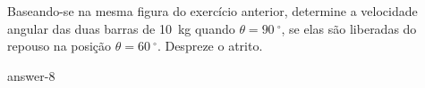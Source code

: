 \item Baseando-se na mesma figura do exercício anterior, determine a velocidade angular das duas barras de \SI{10}{\kilogram} quando $\theta=\SI{90}{^{\circ}}$, se elas são liberadas do repouso na posição $\theta=\SI{60}{^{\circ}}$. Despreze o atrito.

{answer-8}